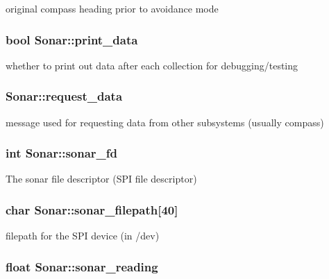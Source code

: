 original compass heading prior to avoidance mode \hypertarget{classSonar_ac9ab4c77456aea18ac1eb886a5c81f4c}{
\subsubsection[{print\-\_\-data}]{\setlength{\rightskip}{0pt plus 5cm}bool Sonar\-::print\-\_\-data\hspace{0.3cm}{\ttfamily [protected]}}}\label{classSonar_ac9ab4c77456aea18ac1eb886a5c81f4c}
whether to print out data after each collection for debugging/testing \hypertarget{classSonar_a464358d71b06ae53bd477a7b629bd16e}{
\subsubsection[{request\-\_\-data}]{ Sonar\-::request\-\_\-data\hspace{0.3cm}{\ttfamily [protected]}}}\label{classSonar_a464358d71b06ae53bd477a7b629bd16e}
message used for requesting data from other subsystems (usually compass) \hypertarget{classSonar_a4799c8b328d7735f7e6d62d741340c6c}{
\subsubsection[{sonar\-\_\-fd}]{\setlength{\rightskip}{0pt plus 5cm}int Sonar\-::sonar\-\_\-fd\hspace{0.3cm}{\ttfamily [protected]}}}\label{classSonar_a4799c8b328d7735f7e6d62d741340c6c}
The sonar file descriptor (S\-P\-I file descriptor) \hypertarget{classSonar_a7db9106da9a50d06b5f25c35f799abe5}{
\subsubsection[{sonar\-\_\-filepath}]{\setlength{\rightskip}{0pt plus 5cm}char Sonar\-::sonar\-\_\-filepath\mbox{[}40\mbox{]}\hspace{0.3cm}{\ttfamily [protected]}}}\label{classSonar_a7db9106da9a50d06b5f25c35f799abe5}
filepath for the S\-P\-I device (in /dev) \hypertarget{classSonar_abd3f8ccfc42cacd700df9be06f70c6b2}{
\subsubsection[{sonar\-\_\-reading}]{\setlength{\rightskip}{0pt plus 5cm}float Sonar\-::sonar\-\_\-reading\hspace{0.3cm}{\ttfamily [protected]}}}\label{classSonar_abd3f8ccfc42cacd700df9be06f70c6b2}
